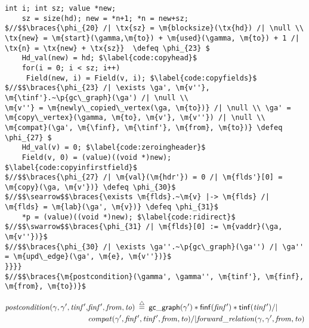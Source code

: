 \begin{figure*}[!ht]
\begin{lstlisting}[multicols=2]
    int i; int sz; value *new;
    sz = size(hd); new = *n+1; *n = new+sz;
$//$$\braces{\phi_{20} /| \tx{sz} = \m{blocksize}(\tx{hd}) /| \null \\ \tx{new} = \m{start}(\gamma,\m{to}) + \m{used}(\gamma, \m{to}) + 1 /| \tx{n} = \tx{new} + \tx{sz}}  \defeq \phi_{23} $      
    Hd_val(new) = hd; $\label{code:copyhead}$
    for(i = 0; i < sz; i++) 
     Field(new, i) = Field(v, i); $\label{code:copyfields}$
$//$$\braces{\phi_{23} /| \exists \ga', \m{v''}, \m{\tinf'}.~\p{gc\_graph}(\ga') /| \null \\ 
\m{v''} = \m{newly\_copied\_vertex(\ga, \m{to})} /| \null \\ \ga' = \m{copy\_vertex}(\gamma, \m{to}, \m{v'}, \m{v''}) /| \null \\ 
\m{compat}(\ga', \m{\finf}, \m{\tinf'}, \m{from}, \m{to})} \defeq \phi_{27} $
    Hd_val(v) = 0; $\label{code:zeroingheader}$
    Field(v, 0) = (value)((void *)new); $\label{code:copyinfirstfield}$
$//$$\braces{\phi_{27} /| \m{val}(\m{hdr'}) = 0 /| \m{flds'}[0] = \m{copy}(\ga, \m{v'})} \defeq \phi_{30}$
$//$$\searrow$$\braces{\exists \m{flds}.~\m{v} |-> \m{flds} /| \m{flds} = \m{lab}(\ga', \m{v})} \defeq \phi_{31}$
    *p = (value)((void *)new); $\label{code:ridirect}$
$//$$\swarrow$$\braces{\phi_{31} /| \m{flds}[0] := \m{vaddr}(\ga, \m{v''})}$
$//$$\braces{\phi_{30} /| \exists \ga''.~\p{gc\_graph}(\ga'') /| \ga'' = \m{upd\_edge}(\ga', \m{e}, \m{v''})}$
}}}}
$//$$\braces{\m{postcondition}(\gamma', \gamma'', \m{tinf'}, \m{finf}, \m{from}, \m{to})}$
\end{lstlisting}
\footnotesize{
\vspace{-0.8em}
\begin{equation*}
\begin{split}
\m{postcondition}(\gamma, \ga', \m{tinf'}, &\m{finf'}, \m{from}, \m{to}) \; \defeq \; 
   \p{gc{\_}graph}(\ga') * \p{\finf}(\m{\finf'}) * \p{\tinf}(\m{\tinf'}) /| \null \\
   &\m{compat}(\ga', \m{\finf'}, \m{\tinf'}, \m{from}, \m{to}) /|
   \m{forward\_relation}(\ga, \ga', \m{from}, \m{to})
\end{split}
\end{equation*}

}
\vspace{-0.4em}
\caption{Clight code and proof sketch for forward}
\label{fig:forward}
\vspace{-1em}
\end{figure*}

